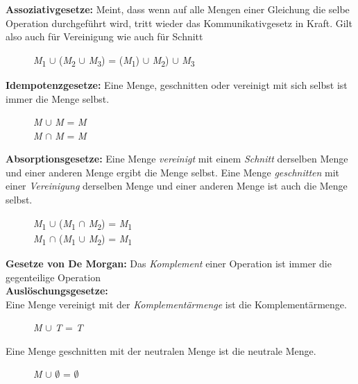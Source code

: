 \textbf{Assoziativgesetze:} Meint, dass wenn auf alle Mengen einer Gleichung die selbe Operation durchgeführt wird, tritt wieder das Kommunikativgesetz in Kraft. Gilt also auch für Vereinigung wie auch für Schnitt\\
\begin{figure}[H]
\centering
\textit{M}\textsubscript{1} $\cup$ (\textit{M}\textsubscript{2} $\cup$ \textit{M}\textsubscript{3}) = 
(\textit{M}\textsubscript{1}) $\cup$ \textit{M}\textsubscript{2}) $\cup$ \textit{M}\textsubscript{3}\\
\end{figure}

\textbf{Idempotenzgesetze:} Eine Menge, geschnitten oder vereinigt mit sich selbst ist immer die Menge selbst.\\
\begin{figure}[H]
\centering
\textit{M} $\cup$ \textit{M} = \textit{M}\\
\textit{M} $\cap$ \textit{M} = \textit{M}\\
\end{figure}

\textbf{Absorptionsgesetze:} Eine Menge \textit{vereinigt} mit einem \textit{Schnitt} derselben Menge und einer anderen Menge ergibt die Menge selbst. Eine Menge \textit{geschnitten} mit einer \textit{Vereinigung} derselben Menge und einer anderen Menge ist auch die Menge selbst. \\
\begin{figure}[H]
\centering
\textit{M}\textsubscript{1} $\cup$ (\textit{M}\textsubscript{1} $\cap$ \textit{M}\textsubscript{2}) = \textit{M}\textsubscript{1}\\ 
\textit{M}\textsubscript{1} $\cap$ (\textit{M}\textsubscript{1} $\cup$ \textit{M}\textsubscript{2}) = \textit{M}\textsubscript{1}\\ 
\end{figure}

\textbf{Gesetze von De Morgan:} Das \textit{Komplement} einer Operation ist immer die gegenteilige Operation\\

\textbf{Auslöschungsgesetze:} \\
Eine Menge vereinigt mit der \textit{Komplementärmenge} ist die Komplementärmenge.\\
\begin{figure}[H]
\centering
\textit{M} $\cup$ \textit{T} = \textit{T}\\
\end{figure}
Eine Menge geschnitten mit der neutralen Menge ist die neutrale Menge.\\
\begin{figure}[H]
\centering
\textit{M} $\cup$ $\emptyset$ = $\emptyset$\\
\end{figure}

